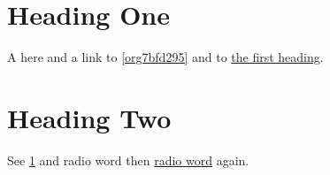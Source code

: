 \documentclass[11pt]{article}
\date{\today}
\title{}
\begin{document}
\tableofcontents

\section{Heading One}
\label{sec:org1c59b52}
A \label{org7bfd295} here and a link to \ref{org7bfd295} and to \hyperref[sec:org1c59b52]{the first heading}.
\section{Heading Two}
\label{sec:org47118c0}
See \ref{sec:org1c59b52} and \label{orgaf3ed89}radio word then \hyperref[orgaf3ed89]{radio word} again.
\end{document}
